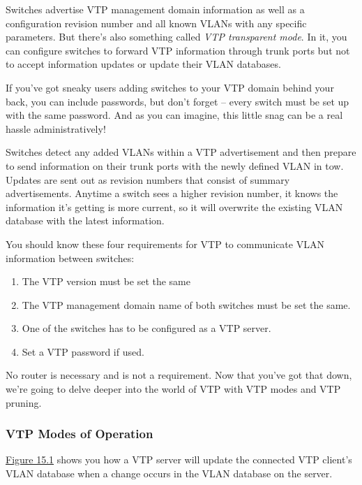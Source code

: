 Switches advertise VTP management domain information as well as a
configuration revision number and all known VLANs with any specific
parameters. But there's also something called \emph{VTP transparent
mode}. In it, you can configure switches to forward VTP information
through trunk ports but not to accept information updates or update
their VLAN databases.

If you've got sneaky users adding switches to your VTP domain behind
your back, you can include passwords, but don't forget -- every switch
must be set up with the same password. And as you can imagine, this
little snag can be a real hassle administratively!

Switches detect any added VLANs within a VTP advertisement and then
prepare to send information on their trunk ports with the newly defined
VLAN in tow. Updates are sent out as revision numbers that consist of
summary advertisements. Anytime a switch sees a higher revision number,
it knows the information it's getting is more current, so it will
overwrite the existing VLAN database with the latest information.

You should know these four requirements for VTP to communicate VLAN
information between switches:

\begin{enumerate}
\item
  The VTP version must be set the same
\item
  The VTP management domain name of both switches must be set the same.
\item
  One of the switches has to be configured as a VTP server.
\item
  Set a VTP password if used.
\end{enumerate}

No router is necessary and is not a requirement. Now that you've got
that down, we're going to delve deeper into the world of VTP with VTP
modes and VTP pruning.

\subsubsection[VTP Modes of
Operation]{\texorpdfstring{\protect\hypertarget{c15.xhtmlux5cux23c15-sec-5}{}{}VTP
Modes of Operation}{VTP Modes of Operation}}

\protect\hyperlink{c15.xhtmlux5cux23figure15-1}{Figure 15.1} shows you
how a VTP server will update the connected VTP client's VLAN database
when a change occurs in the VLAN database on the server.

